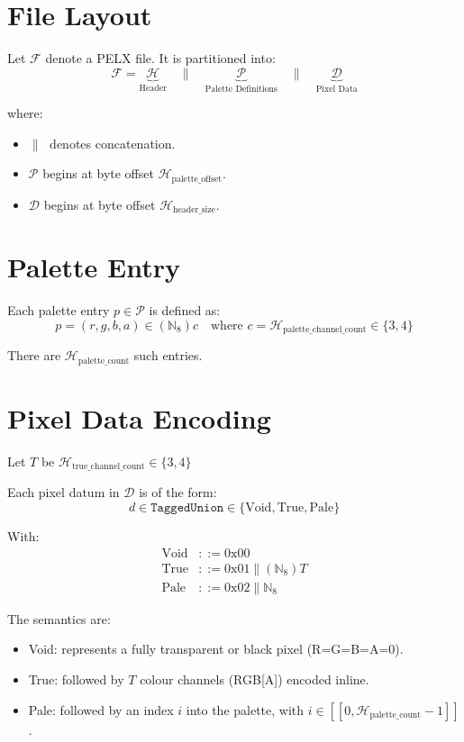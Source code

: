 \documentclass{article}
\begin{document}
\section{File Layout}

Let $\mathcal{F}$ denote a PELX file. It is partitioned into:
\[
	\mathcal{F} = \underbrace{\mathcal{H}}_{\text{Header}} \quad \| \quad
	\underbrace{\mathcal{P}}_{\text{Palette Definitions}} \quad \| \quad
	\underbrace{\mathcal{D}}_{\text{Pixel Data}}
\]

where:
\begin{itemize}
	\item $\|\;$ denotes concatenation.
	\item $\mathcal{P}$ begins at byte offset $\mathcal{H}_{\text{palette\_offset}}$.
	\item $\mathcal{D}$ begins at byte offset $\mathcal{H}_{\text{header\_size}}$.
\end{itemize}

\section{Palette Entry}

Each palette entry $p \in \mathcal{P}$ is defined as:
\[
	p = (r, g, b, a) \in (\mathbb{N}_8)c \quad \text{where } c = \mathcal{H}_{\text{palette\_channel\_count}} \in \{3, 4\}
\]

There are $\mathcal{H}_{\text{palette\_count}}$ such entries.

\section{Pixel Data Encoding}

Let $T$ be $\mathcal{H}_{\text{true\_channel\_count}} \in \{3, 4\}$

Each pixel datum in $\mathcal{D}$ is of the form:
\[
	d \in \texttt{TaggedUnion} \in \{ \text{Void}, \text{True}, \text{Pale} \}
\]

With:
\begin{align*}
	\text{Void} &::= 0\text{x}00 \\
	\text{True} &::= 0\text{x}01 \| (\mathbb{N}_8)T \\
	\text{Pale} &::= 0\text{x}02 \| \mathbb{N}_8
\end{align*}

The semantics are:
\begin{itemize}
	\item Void: represents a fully transparent or black pixel (R=G=B=A=0).
	\item True: followed by $T$ colour channels (RGB[A]) encoded inline.
	\item Pale: followed by an index $i$ into the palette, with $i \in [\![0, \mathcal{H}_{\text{palette\_count}} - 1]\!]$.
\end{itemize}
\end{document}
